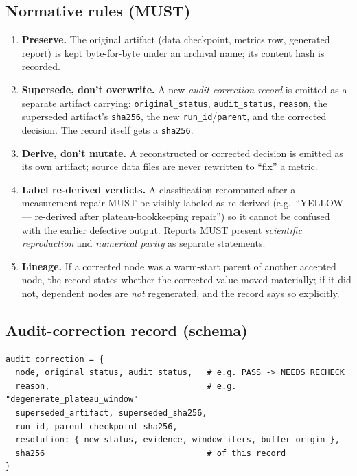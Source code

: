 \documentclass[11pt]{article}
\newcommand{\code}[1]{\texttt{#1}}
\begin{document}
\subsection{Normative rules (MUST)}
\begin{enumerate}[leftmargin=1.6em]
\item \textbf{Preserve.} The original artifact (data checkpoint, metrics row, generated report) is kept
byte-for-byte under an archival name; its content hash is recorded.
\item \textbf{Supersede, don't overwrite.} A new \emph{audit-correction record} is emitted as a separate
artifact carrying: \code{original\_status}, \code{audit\_status}, \code{reason}, the superseded
artifact's \code{sha256}, the new \code{run\_id}/\code{parent}, and the corrected decision. The record
itself gets a \code{sha256}.
\item \textbf{Derive, don't mutate.} A reconstructed or corrected decision is emitted as its own artifact;
source data files are never rewritten to ``fix'' a metric.
\item \textbf{Label re-derived verdicts.} A classification recomputed after a measurement repair MUST be
visibly labeled as re-derived (e.g.\ ``YELLOW --- re-derived after plateau-bookkeeping repair'') so it
cannot be confused with the earlier defective output. Reports MUST present \emph{scientific reproduction}
and \emph{numerical parity} as separate statements.
\item \textbf{Lineage.} If a corrected node was a warm-start parent of another accepted node, the record
states whether the corrected value moved materially; if it did not, dependent nodes are \emph{not}
regenerated, and the record says so explicitly.
\end{enumerate}

\subsection{Audit-correction record (schema)}
\begin{lstlisting}
audit_correction = {
  node, original_status, audit_status,   # e.g. PASS -> NEEDS_RECHECK
  reason,                                # e.g. "degenerate_plateau_window"
  superseded_artifact, superseded_sha256,
  run_id, parent_checkpoint_sha256,
  resolution: { new_status, evidence, window_iters, buffer_origin },
  sha256                                 # of this record
}
\end{lstlisting}
\end{document}
